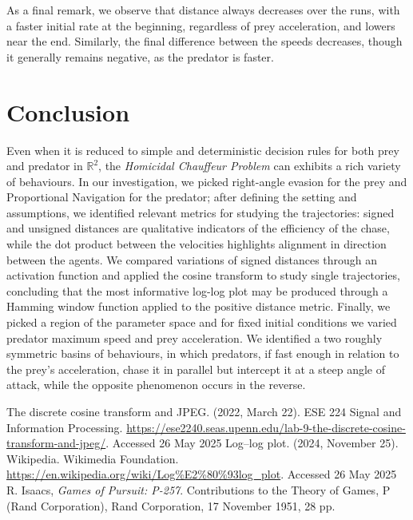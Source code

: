 \documentclass[10pt, twocolumn]{article}
\begin{document}
          As a final remark, we observe that distance always decreases over the runs, with a faster initial rate at the beginning, regardless of prey acceleration, and lowers near the end. Similarly, the final difference between the speeds decreases, though it generally remains negative, as the predator is faster.
          \section{Conclusion}
          Even when it is reduced to simple and deterministic decision rules for both prey and predator in $\mathbb{R}^2$, the \textit{Homicidal Chauffeur Problem} can exhibits a rich variety of behaviours. In our investigation, we picked right-angle evasion for the prey and Proportional Navigation for the predator; after defining the setting and assumptions, we identified relevant metrics for studying the trajectories: signed and unsigned distances are qualitative indicators of the efficiency of the chase, while the dot product between the velocities highlights alignment in direction between the agents. We compared variations of signed distances through an activation function and applied the cosine transform to study single trajectories, concluding that the most informative log-log plot may be produced through a Hamming window function applied to the positive distance metric. Finally, we picked a region of the parameter space and for fixed initial conditions we varied predator maximum speed and prey acceleration. We identified a two roughly symmetric basins of behaviours, in which predators, if fast enough in relation to the prey's acceleration, chase it in parallel but intercept it at a steep angle of attack, while the opposite phenomenon occurs in the reverse.

          \begin{thebibliography}{99}
             The discrete cosine transform and JPEG. (2022, March 22). ESE 224 Signal and Information Processing. \url{https://ese2240.seas.upenn.edu/lab-9-the-discrete-cosine-transform-and-jpeg/}. Accessed 26 May 2025
             Log–log plot. (2024, November 25). Wikipedia. Wikimedia Foundation. \url{https://en.wikipedia.org/wiki/Log%E2%80%93log_plot}. Accessed 26 May 2025
               R. Isaacs, \emph{Games of Pursuit: P-257}. Contributions to the Theory of Games, P (Rand Corporation), Rand Corporation, 17 November 1951, 28 pp.
            \end{thebibliography}
            
\end{document}
